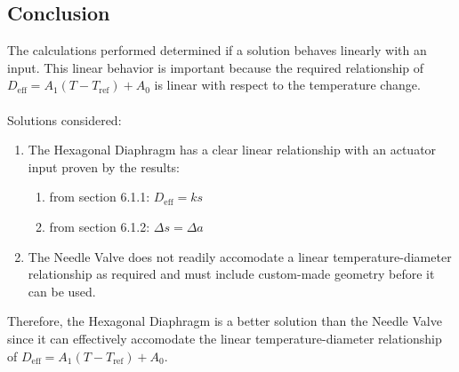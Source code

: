 \documentclass[11pt]{article}
\begin{document}
\subsection{Conclusion}
The calculations performed determined if a solution behaves linearly with an input. This linear behavior is important because the required relationship of $D_{\text{eff}} = A_1(T-T_{\text{ref}})+A_0$ is linear with respect to the temperature change.
\\~\\
Solutions considered:
\begin{enumerate}
    \item The Hexagonal Diaphragm has a clear linear relationship with an actuator input proven by the results:
    \begin{enumerate}
        \item from section 6.1.1: $D_{\text{eff}} = ks $
        \item from section 6.1.2: $\Delta s = \Delta a$
    \end{enumerate}
    \item The Needle Valve does not readily accomodate a linear temperature-diameter relationship as required and must include custom-made geometry before it can be used.
\end{enumerate}
Therefore, the Hexagonal Diaphragm is a better solution than the Needle Valve since it can effectively accomodate the linear temperature-diameter relationship of $D_{\text{eff}} = A_1(T-T_{\text{ref}})+A_0$.
\end{document}
